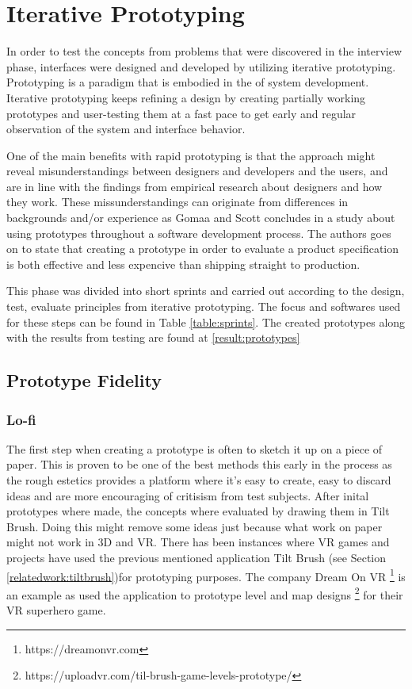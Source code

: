 \section{Iterative Prototyping}
\label{method:prototype}
In order to test the concepts from problems that were discovered in the interview phase, interfaces were designed and developed by utilizing iterative prototyping. Prototyping is a paradigm that is embodied in the  of system development\cite{proto:Gomaa1981}. Iterative prototyping keeps refining a design by creating partially working prototypes and user-testing them at a fast pace to get early and regular observation of the system and interface behavior\cite{proto:hartson2012ux}.

One of the main benefits with rapid prototyping is that the approach might reveal misunderstandings between designers and developers and the users, and are in line with the findings from empirical research about designers and how they work\cite{proto:tripp1990rapid}. These missunderstandings can originate from differences in backgrounds and/or experience as Gomaa and Scott concludes in a study about using prototypes throughout a software development process.\cite{proto:Lichter1993} The authors goes on to state that creating a prototype in order to evaluate a product specification is both effective and less expencive than shipping straight to production.

This phase was divided into short sprints and carried out according to the design, test, evaluate principles from iterative prototyping.\cite{proto:hartson2012ux} The focus and softwares used for these steps can be found in Table \ref{table:sprints}. The created prototypes along with the results from testing are found at \ref{result:prototypes}
\subsection{Prototype Fidelity}
\subsubsection{Lo-fi}
\label{method:prototype:lofi}
The first step when creating a prototype is often to sketch it up on a piece of paper. This is proven to be one of the best methods this early in the process as the rough estetics provides a platform where it's easy to create, easy to discard ideas and are more encouraging of critisism from test subjects. \cite{proto:boling1997holistic} After inital prototypes where made, the concepts where evaluated by drawing them in Tilt Brush. Doing this might remove some ideas just because what work on paper might not work in 3D and VR. There has been instances where VR games and projects have used the previous mentioned application Tilt Brush (see Section \ref{relatedwork:tiltbrush})for prototyping purposes. The company Dream On VR \footnote{https://dreamonvr.com} is an example as used the application to prototype level and map designs \footnote{https://uploadvr.com/til-brush-game-levels-prototype/} for their VR superhero game.

